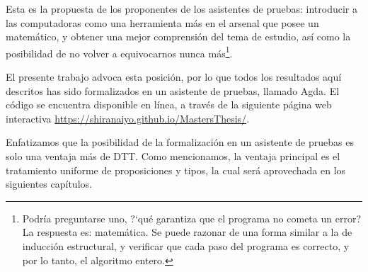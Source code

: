 \documentclass[../main.tex]{subfiles}
\begin{document}
Esta es la propuesta de los proponentes de los asistentes de pruebas: introducir a las computadoras como una herramienta m\'as en el arsenal que posee un matem\'atico, y obtener una mejor comprensi\'on del tema de estudio, as\'i como la posibilidad de no volver a equivocarnos nunca m\'as\footnote{Podr\'ia preguntarse uno, ?`qu\'e garantiza que el programa no cometa un error? La respuesta es: matemática. Se puede razonar de una forma similar a la de inducción estructural, y verificar que cada paso del programa es correcto, y por lo tanto, el algoritmo entero.}.

El presente trabajo advoca esta posici\'on, por lo que todos los resultados aqu\'i descritos has sido formalizados en un asistente de pruebas, llamado Agda.
El c\'odigo se encuentra disponible en l\'inea, a trav\'es de la siguiente p\'agina web interactiva \url{https://shiranaiyo.github.io/MastersThesis/}.

Enfatizamos que la posibilidad de la formalizaci\'on en un asistente de pruebas es solo una ventaja m\'as de DTT.
Como mencionamos, la ventaja principal es el tratamiento uniforme de proposiciones y tipos, la cual ser\'a aprovechada en los siguientes cap\'itulos.
\end{document}
